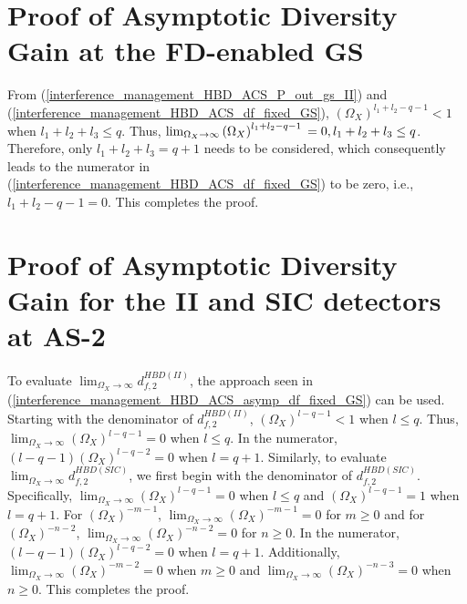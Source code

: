 \section{Proof of Asymptotic Diversity Gain at the FD-enabled GS} \label{interference_management_HBD_ACS_coro_asymp_df_fixed_GS_proof}
From (\ref{interference_management_HBD_ACS_P_out_gs_II}) and (\ref{interference_management_HBD_ACS_df_fixed_GS}), $\left(\Omega_X\right)^{l_1+l_2-q-1} < 1$ when $l_1 + l_2 + l_3 \leq q$. Thus, $\lim_{\Omega_X\to\infty} \left(\Omega_X\right)^{l_1+l_2-q-1} \\ = 0, l_1 + l_2 + l_3 \leq q$. Therefore, only $l_1 + l_2  + l_3 = q + 1$ needs to be considered, which consequently leads to the numerator in (\ref{interference_management_HBD_ACS_df_fixed_GS}) to be zero, i.e., $l_1 + l_2 - q - 1 = 0$. This completes the proof.

\section{Proof of Asymptotic Diversity Gain for the II and SIC detectors at AS-2} \label{interference_management_HBD_ACS_coro_asymp_df_fixed_AS2_proof}
To evaluate $\lim_{\Omega_X\to\infty} d_{f,2}^{HBD(II)}$, the approach seen in (\ref{interference_management_HBD_ACS_asymp_df_fixed_GS}) can be used. Starting with the denominator of $d_{f,2}^{HBD(II)}$, $\left(\Omega_X\right)^{l-q-1} < 1$ when $l \leq q$. Thus, $\lim_{\Omega_X\to\infty} \left(\Omega_X\right)^{l-q-1} = 0$ when $l \leq q$. In the numerator, $(l-q-1) \left(\Omega_X\right)^{l-q-2} = 0$ when $l=q+1$. Similarly, to evaluate $\lim_{\Omega_X\to\infty} d_{f,2}^{HBD(SIC)}$, we first begin with the denominator of $d_{f,2}^{HBD(SIC)}$. Specifically, $\lim_{\Omega_X\to\infty}(\Omega_X)^{l-q-1}=0 $ when $l\leq{q}$ and $(\Omega_X)^{l-q-1}=1$ when $l=q+1$. For $(\Omega_X)^{-m-1}$, $\lim_{\Omega_X\to\infty}(\Omega_X)^{-m-1}=0 $ for $m\geq0$ and for $(\Omega_X)^{-n-2}$, $\lim_{\Omega_X\to\infty}(\Omega_X)^{-n-2}=0 $ for $n\geq0$. In the numerator, $(l-q-1) \left(\Omega_X\right)^{l-q-2} = 0$ when $l=q+1$. Additionally, $\lim_{\Omega_X\to\infty} (\Omega_X)^{-m-2}=0$ when $m\geq0$ and $\lim_{\Omega_X\to\infty} (\Omega_X)^{-n-3}=0$ when $n\geq0$. This completes the proof.

